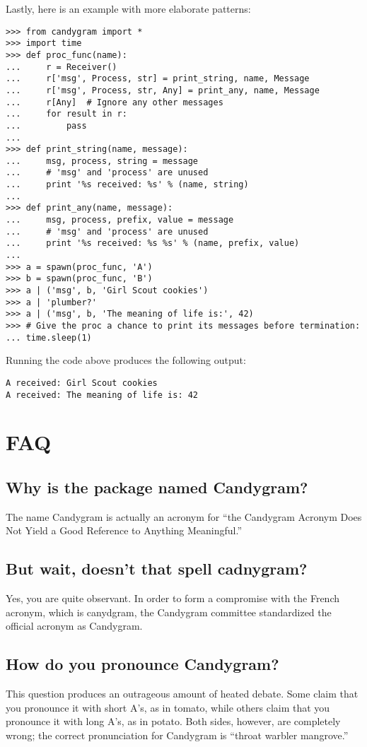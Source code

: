 \documentclass{howto}
\begin{document}
Lastly, here is an example with more elaborate patterns:
\begin{verbatim}
>>> from candygram import *
>>> import time
>>> def proc_func(name):
...     r = Receiver()
...     r['msg', Process, str] = print_string, name, Message
...     r['msg', Process, str, Any] = print_any, name, Message
...     r[Any]  # Ignore any other messages
...     for result in r:
...         pass
...
>>> def print_string(name, message):
...     msg, process, string = message
...     # 'msg' and 'process' are unused
...     print '%s received: %s' % (name, string)
...
>>> def print_any(name, message):
...     msg, process, prefix, value = message
...     # 'msg' and 'process' are unused
...     print '%s received: %s %s' % (name, prefix, value)
...
>>> a = spawn(proc_func, 'A')
>>> b = spawn(proc_func, 'B')
>>> a | ('msg', b, 'Girl Scout cookies')
>>> a | 'plumber?'
>>> a | ('msg', b, 'The meaning of life is:', 42)
>>> # Give the proc a chance to print its messages before termination:
... time.sleep(1)
\end{verbatim}
Running the code above produces the following output:
\begin{verbatim}
A received: Girl Scout cookies
A received: The meaning of life is: 42
\end{verbatim}



\section{FAQ}

\subsection{Why is the package named Candygram?}
The name Candygram is actually an acronym for ``the Candygram Acronym Does Not
Yield a Good Reference to Anything Meaningful.''

\subsection{But wait, doesn't that spell {\sc cadnygram}?}
Yes, you are quite observant. In order to form a compromise with the French
acronym, which is {\sc canydgram}, the Candygram committee standardized the
official acronym as {\sc Candygram}.

\subsection{How do you pronounce Candygram?}
This question produces an outrageous amount of heated debate. Some claim that
you pronounce it with short A's, as in tomato, while others claim that you
pronounce it with long A's, as in potato. Both sides, however, are completely
wrong; the correct pronunciation for Candygram is ``throat warbler mangrove.''
\end{document}
